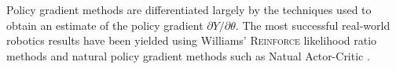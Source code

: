 Policy gradient methods are differentiated largely by the techniques used to
obtain an estimate of the policy gradient $\partial Y / \partial \theta$.
The most successful real-world robotics results have been yielded using
Williams' \textsc{Reinforce} likelihood ratio methods \cite{williams:reinforce}
and natural policy gradient methods such as Natual Actor-Critic
\cite{peters:enac}.

%
%
%


